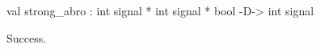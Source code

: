 \chklistingtrue
{}
\begin{ChkListingMsg}
val strong_abro : int signal * int signal * bool -D-> int signal
\end{ChkListingMsg}
\begin{ChkListingErr}
Success.
\end{ChkListingErr}
